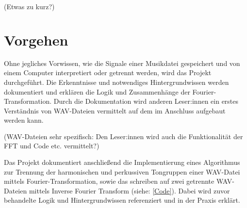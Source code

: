 \par


(Etwas zu kurz?)

%
\section{Vorgehen}
%

Ohne jegliches Vorwissen, wie die Signale einer Musikdatei gespeichert und von einem Computer interpretiert oder getrennt werden, wird das Projekt durchgeführt. Die Erkenntnisse und notwendiges Hintergrundwissen werden dokumentiert und erklären die Logik und Zusammenhänge der Fourier-Transformation. Durch die Dokumentation wird anderen Leser:innen ein erstes Verständnis von WAV-Dateien vermittelt auf dem im Anschluss aufgebaut werden kann.

\par

(WAV-Dateien sehr spezifisch: Den Leser:innen wird auch die Funktionalität der FFT und Code etc. vermittelt?)

\par

Das Projekt dokumentiert anschließend die Implementierung eines Algorithmus zur Trennung der harmonischen und perkussiven Tongruppen einer WAV-Datei mittels Fourier-Transformation, sowie das schreiben auf zwei getrennte WAV-Dateien mittels Inverse Fourier Transform (siehe: \cref{Code}). Dabei wird zuvor behandelte Logik und Hintergrundwissen referenziert und in der Praxis erklärt.